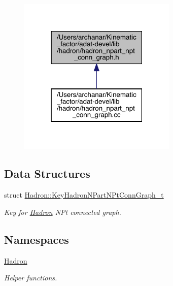 \nopagebreak
\begin{figure}[H]
\begin{center}
\leavevmode
\includegraphics[width=214pt]{d8/d79/adat-devel_2lib_2hadron_2hadron__npart__npt__conn__graph_8h__dep__incl}
\end{center}
\end{figure}
\subsection*{Data Structures}
\begin{DoxyCompactItemize}
\item 
struct \mbox{\hyperlink{structHadron_1_1KeyHadronNPartNPtConnGraph__t}{Hadron\+::\+Key\+Hadron\+N\+Part\+N\+Pt\+Conn\+Graph\+\_\+t}}
\begin{DoxyCompactList}\small\item\em Key for \mbox{\hyperlink{namespaceHadron}{Hadron}} N\+Pt connected graph. \end{DoxyCompactList}\end{DoxyCompactItemize}
\subsection*{Namespaces}
\begin{DoxyCompactItemize}
\item 
 \mbox{\hyperlink{namespaceHadron}{Hadron}}
\begin{DoxyCompactList}\small\item\em Helper functions. \end{DoxyCompactList}\end{DoxyCompactItemize}
